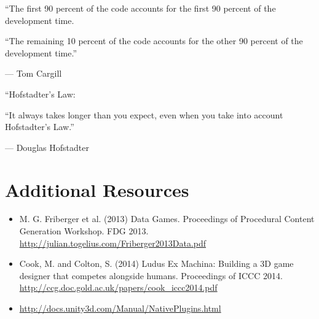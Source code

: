 \documentclass{../fal_assignment}
\begin{document}
\begin{marginquote}
    ``The first 90 percent of the code accounts for the first 90 percent of the development time.
    
    ``The remaining 10 percent of the code accounts for the other 90 percent of the development time.''
    
    --- Tom Cargill
    
    \marginquoterule
    
    ``Hofstadter's Law:
    
    ``It always takes longer than you expect, even when you take into account Hofstadter's Law.''
    
    --- Douglas Hofstadter
\end{marginquote}
\section*{Additional Resources}

\begin{itemize}
    \item M. G. Friberger et al. (2013) Data Games. Proceedings of Procedural Content Generation Workshop. FDG 2013.
        \url{http://julian.togelius.com/Friberger2013Data.pdf}
    \item Cook, M. and Colton, S. (2014) Ludus Ex Machina: Building a 3D game designer that competes alongside humans. Proceedings of ICCC 2014.
        \url{http://ccg.doc.gold.ac.uk/papers/cook_iccc2014.pdf}
    \item \url{http://docs.unity3d.com/Manual/NativePlugins.html}
\end{itemize}
\end{document}
